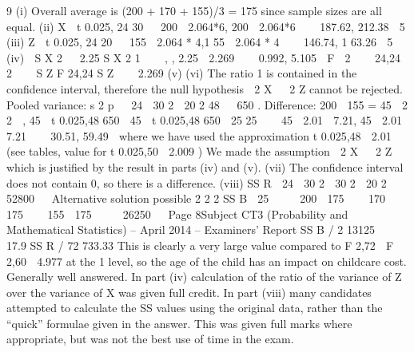 9
(i) Overall average is (200 + 170 + 155)/3 = 175 since sample sizes are all equal.
(ii) X  t 0.025, 24
30
  200  2.064*6, 200  2.064*6    187.62, 212.38 
5
(iii) Z  t 0.025, 24
20
  155  2.064 * 4,1 55  2.064 * 4    146.74, 1 63.26 
5
(iv)  S X 2
  2.25
S X 2
1



,
, 2.25  2.269    0.992, 5.105 
F
 2
  
24,24
2

  S Z F 24,24 S Z
   2.269
(v)
(vi)
The ratio 1 is contained in the confidence interval, therefore the null
hypothesis  2 X   2 Z cannot be rejected.
Pooled variance:
s 2 p


24  30 2  20 2
48
  650 .
Difference: 200  155 = 45

2
2 
, 45  t 0.025,48 650
 45  t 0.025,48 650

25
25 

 45  2.01  7.21, 45  2.01  7.21    30.51, 59.49 
where we have used the approximation t 0.025,48  2.01 (see tables, value for
t 0.025,50  2.009 )
We made the assumption  2 X   2 Z which is justified by the result in parts (iv)
and (v).
(vii) The confidence interval does not contain 0, so there is a difference.
(viii) SS R  24  30 2  30 2  20 2  52800


Alternative solution possible
2
2
2
SS B  25     200  175    170  175    155  175     26250


Page 8Subject CT3 (Probability and Mathematical Statistics) – April 2014 – Examiners’ Report
SS B / 2 13125

 17.9
SS R / 72 733.33
This is clearly a very large value compared to F 2,72  F 2,60  4.977 at the 1%
level, so the age of the child has an impact on childcare cost.
Generally well answered. In part (iv) calculation of the ratio of the variance of Z over the
variance of X was given full credit. In part (viii) many candidates attempted to calculate the
SS values using the original data, rather than the “quick” formulae given in the answer. This
was given full marks where appropriate, but was not the best use of time in the exam.
